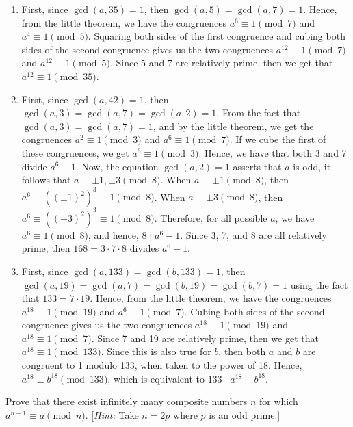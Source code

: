 \begin{solution}
    \begin{enumerate}
        \item First, since $\gcd(a, 35) = 1$, then $\gcd(a, 5) = \gcd(a, 7) = 1$. Hence, from the little theorem, we have the congruences $a^6 \equiv 1 \pmod 7$ and $a^4 \equiv 1 \pmod 5$. Squaring both sides of the first congruence and cubing both sides of the second congruence gives us the two congruences $a^{12} \equiv 1 \pmod 7$ and $a^{12} \equiv 1 \pmod 5$. Since 5 and 7 are relatively prime, then we get that $a^{12} \equiv 1 \pmod{35}$.
        \item First, since $\gcd(a, 42) = 1$, then $\gcd(a, 3) = \gcd(a, 7) = \gcd(a, 2) = 1$. From the fact that $\gcd(a, 3) = \gcd(a, 7) = 1$, and by the little theorem, we get the congruences $a^2 \equiv 1 \pmod 3$ and $a^6 \equiv 1 \pmod 7$. If we cube the first of these congruences, we get $a^6 \equiv 1 \pmod 3$. Hence, we have that both 3 and 7 divide $a^6 - 1$. Now, the equation $\gcd(a, 2) = 1$ asserts that $a$ is odd, it follows that $a \equiv \pm 1, \pm 3 \pmod 8$. When $a \equiv \pm 1 \pmod 8$, then $a^6 \equiv ((\pm 1)^2)^3 \equiv 1 \pmod 8$. When $a \equiv \pm 3 \pmod 8$, then $a^6 \equiv ((\pm 3)^2)^3 \equiv 1 \pmod 8$. Therefore, for all possible $a$, we have $a^6 \equiv 1 \pmod 8$, and hence, $8 \mid a^6 - 1$. Since 3, 7, and 8 are all relatively prime, then $168 = 3\cdot 7 \cdot 8$ divides $a^6 - 1$.
        \item First, since $\gcd(a, 133) = \gcd(b, 133) = 1$, then $\gcd(a, 19) = \gcd(a, 7) = \gcd(b, 19) = \gcd(b, 7) = 1$ using the fact that $133 = 7 \cdot 19$. Hence, from the little theorem, we have the congruences $a^{18} \equiv 1 \pmod{19}$ and $a^6 \equiv 1 \pmod 7$. Cubing both sides of the second congruence gives us the two congruences $a^{18} \equiv 1 \pmod{19}$ and $a^{18} \equiv 1 \pmod 7$. Since 7 and 19 are relatively prime, then we get that $a^{18} \equiv 1 \pmod{133}$. Since this is also true for $b$, then both $a$ and $b$ are congruent to 1 modulo 133, when taken to the power of 18. Hence, $a^{18} \equiv b^{18} \pmod{133}$, which is equivalent to $133 \mid a^{18} - b^{18}$. \\
    \end{enumerate}
\end{solution}

\begin{exercise}
    Prove that there exist infinitely many composite numbers $n$ for which $a^{n-1} \equiv a \pmod n$. [\textit{Hint:} Take $n = 2p$ where $p$ is an odd prime.]\\
\end{exercise}

